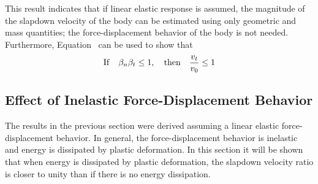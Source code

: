 This result indicates that if linear elastic response is assumed, the
magnitude of the slapdown velocity of the body can be estimated using
only geometric and mass quantities; the force-displacement behavior of
the body is not needed.  Furthermore, Equation~ can be
used to show that 
\begin{equation}
{\rm If} \quad\beta_n\beta_t \leq1, \quad{\rm then} 
\quad\frac{v_t}{v_0} \leq1\label{eq:blbr}
\end{equation}

\subsection{Effect of Inelastic Force-Displacement Behavior}

The results in the previous section were derived assuming a linear
elastic force-displacement behavior.  In general, the force-displacement
behavior is inelastic and energy is dissipated by plastic deformation.
In this section it will be shown that when energy is dissipated by
plastic deformation, the slapdown velocity ratio is closer to 
unity than if there is no energy dissipation. 

